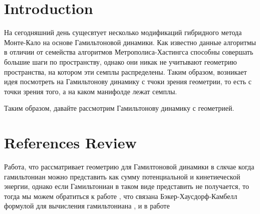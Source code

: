  

\section{Introduction}
На сегодняшний день сущесвтует несколько модификаций гибридного метода Монте-Кало на основе Гамильтоновой динамики.  Как известно данные алгоритмы в отличии от семейства алгоритмов Метрополиса-Хастингса способны совершать большие шаги по пространству, однако они никак не учитывают геометрию пространства, на котором эти семплы распределены. Таким образом, возникает идея посмотреть на Гамильтонову динамику с тчоки зрения геометрии, то есть с точки зрения того, а на каком манифолде лежат семплы.

Таким образом, давайте рассмотрим Гамильтонову динамику с геометрией.

\section{References Review}
Работа, что рассматривает геометрию для Гамилтоновой динамики в слкчае когда гамильтониан можно представить как сумму потенциальной и кинетиеческой энергии\cite{RMHMC}, однако если Гамильтониан в таком виде представить не получается, то тогда мы можем обратиться к работе , что связана Бэкер-Хаусдорф-Камбелл формулой для вычисления гамильтониана , и в работе\cite{SMHMC}


